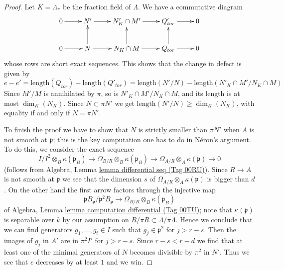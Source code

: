\documentclass{amsart}
\theoremstyle{plain}
\theoremstyle{definition}
\theoremstyle{remark}
\numberwithin{equation}{subsection}
\begin{document}
\begin{proof}
\medskip\noindent
Let $K = \Lambda_\pi$ be the fraction field of $\Lambda$.
We have a commutative diagram
$$
\xymatrix{
0 \ar[r] &
N' \ar[r] &
N'_K \cap M' \ar[r] &
Q'_{tor} \ar[r] &
0 \\
0 \ar[r] &
N \ar[r] \ar[u] &
N_K \cap M \ar[r] \ar[u] &
Q_{tor} \ar[r] \ar[u] &
0
}
$$
whose rows are short exact sequences. This shows that the change in defect
is given by
$$
e - e' =
\text{length}(Q_{tor}) - \text{length}(Q'_{tor})
=
\text{length}(N'/N) - \text{length}(N'_K \cap M' / N_K \cap M)
$$
Since $M'/M$ is annihilated by $\pi$, so is $N'_K \cap M' / N_K \cap M$,
and its length is at most $\dim_K(N_K)$.
Since $N \subset \pi N'$ we get $\text{length}(N'/N) \ge \dim_K(N_K)$,
with equality if and only if $N = \pi N'$.

\medskip\noindent
To finish the proof we have to show that $N$ is strictly smaller
than $\pi N'$ when $A$ is not smooth at $\mathfrak p$;
this is the key computation one has to do in N\'eron's argument.
To do this, we consider the exact sequence
$$
I/I^2 \otimes_B \kappa(\mathfrak p_B)
\to \Omega_{B/R} \otimes_B \kappa(\mathfrak p_B)
\to \Omega_{A/R} \otimes_A \kappa(\mathfrak p) \to 0
$$
(follows from Algebra, Lemma \href{https://stacks.math.columbia.edu/tag/00RU}{lemma differential seq (Tag 00RU)}).
Since $R \to A$ is not smooth at $\mathfrak p$ we see that the dimension $s$ of
$\Omega_{A/R} \otimes_A \kappa(\mathfrak p)$
is bigger than $d$. On the other hand
the first arrow factors through the injective map
$$
\mathfrak p B_\mathfrak p/\mathfrak p^2 B_\mathfrak p
\to \Omega_{B/R} \otimes_B \kappa(\mathfrak p_B)
$$
of Algebra, Lemma \href{https://stacks.math.columbia.edu/tag/00TU}{lemma computation differential (Tag 00TU)};
note that $\kappa(\mathfrak p)$ is separable over $k$
by our assumption on $R/\pi R \subset \Lambda/\pi \Lambda$.
Hence we conclude that we can find generators
$g_1, \ldots, g_t \in I$ such that $g_j \in \mathfrak p^2$
for $j > r - s$. Then the images of $g_j$ in $A'$ are in $\pi^2 I'$
for $j > r - s$. Since $r - s < r - d$
we find that at least one of the minimal generators
of $N$ becomes divisible by $\pi^2$ in $N'$.
Thus we see that $e$ decreases by at least $1$ and we win.
\end{proof}
\end{document}
